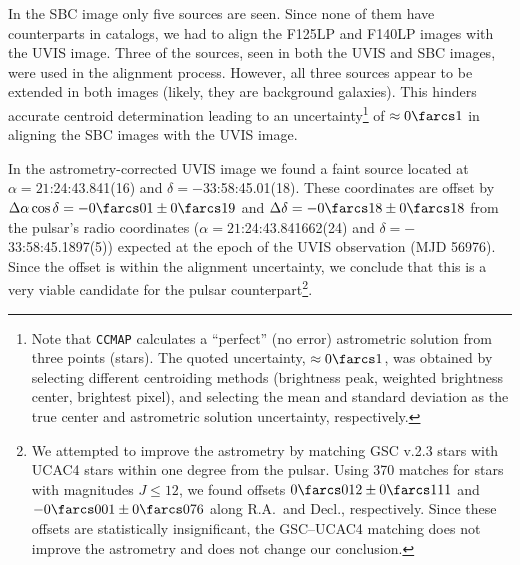 \documentclass[iop]{emulateapj}
\begin{document}

In the SBC image only five sources are seen. Since none of them have counterparts in catalogs, we had to align the F125LP and F140LP images with the UVIS image. Three of the  sources, seen in both  the UVIS and SBC images,  were used in the alignment process.  However, all three sources  appear to be extended  in both images (likely, they are background galaxies). This hinders accurate centroid determination leading to an uncertainty\footnote{Note that \texttt{CCMAP} calculates a ``perfect'' (no error) astrometric solution from three points (stars). The quoted uncertainty, $\approx0\farcs1$, was obtained by selecting different centroiding methods (brightness peak, weighted brightness center, brightest pixel), and selecting the mean and standard deviation as the true center and astrometric solution uncertainty, respectively.} of $\approx0\farcs1$ in aligning the SBC images with  the UVIS image.

In the astrometry-corrected UVIS image we found a faint source located at $\alpha=21$:24:43.841(16) and $\delta=-$33:58:45.01(18). These coordinates are offset by $\Delta\alpha\cos\delta=-0\farcs01\pm0\farcs19$ and $\Delta\delta=-0\farcs18\pm0\farcs18$ from the pulsar's radio coordinates ($\alpha=21$:24:43.841662(24) and $\delta=-$33:58:45.1897(5)) expected at the epoch of the UVIS observation (MJD 56976). Since the offset is within the alignment uncertainty, we conclude that this is a very viable candidate for the pulsar counterpart\footnote{We attempted to improve the astrometry by matching GSC v.2.3 stars with UCAC4 stars  within one degree from the pulsar. Using 370 matches for stars with magnitudes $J\leq12$, we found offsets $0\farcs 012\pm 0\farcs 111$ and $-0\farcs001\pm 0\farcs 076$ along R.A.\ and Decl., respectively. Since these offsets are statistically insignificant, the GSC--UCAC4 matching does not improve the astrometry and does not change our conclusion.}.
\end{document}
